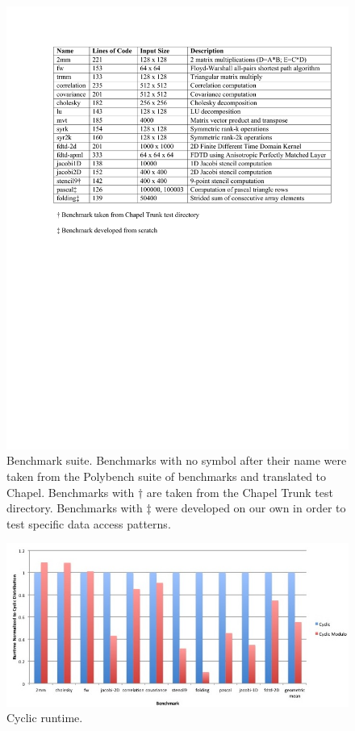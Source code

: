 \begin{figure}
	\begin{center}
	\includegraphics[scale=0.55]{./Figures/Benchmarks.pdf}
	\caption{Benchmark suite. Benchmarks with no symbol after their name were taken from the Polybench suite of benchmarks and translated to Chapel. Benchmarks with $\dagger$ are taken from the Chapel Trunk test directory. Benchmarks with $\ddagger$ were developed on our own in order to test specific data access patterns. }
	\label{benchmarks}
	\end{center}
\end{figure}

\begin{figure}
	\begin{center}
	\includegraphics[scale=0.30]{./Figures/cyclic_runtime}
	\caption{Cyclic runtime.}
	\label{cyclic_runtime}
	\end{center}
\end{figure}

